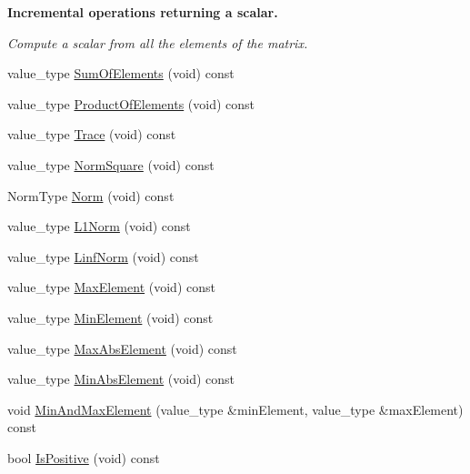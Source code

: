 \begin{Indent}{\bf Incremental operations returning a scalar.}\par
{\em Compute a scalar from all the elements of the matrix. }\begin{DoxyCompactItemize}
\item 
value\+\_\+type \hyperlink{classvct_dynamic_const_matrix_base_a134c1b6991bafceabe7bb6baa08e05b9}{Sum\+Of\+Elements} (void) const 
\item 
value\+\_\+type \hyperlink{classvct_dynamic_const_matrix_base_ae2401f9df53f4d7b880c271c4117d542}{Product\+Of\+Elements} (void) const 
\item 
value\+\_\+type \hyperlink{classvct_dynamic_const_matrix_base_a69cd40632166abe056fc04afebd3922f}{Trace} (void) const 
\item 
value\+\_\+type \hyperlink{classvct_dynamic_const_matrix_base_a9ab094a525c18fa94af35fc9b7c8b675}{Norm\+Square} (void) const 
\item 
Norm\+Type \hyperlink{classvct_dynamic_const_matrix_base_ae921451637b0607e37648a71903209c5}{Norm} (void) const 
\item 
value\+\_\+type \hyperlink{classvct_dynamic_const_matrix_base_af283598f2cd1fe140c29c7c797bbacae}{L1\+Norm} (void) const 
\item 
value\+\_\+type \hyperlink{classvct_dynamic_const_matrix_base_aa5e4b0efae23402d75dce86bb4b0357b}{Linf\+Norm} (void) const 
\item 
value\+\_\+type \hyperlink{classvct_dynamic_const_matrix_base_a0b851bf9b21d090b357fd0382d9149f6}{Max\+Element} (void) const 
\item 
value\+\_\+type \hyperlink{classvct_dynamic_const_matrix_base_a7c06585d5f8b84c9b7254aa4d5bf87d5}{Min\+Element} (void) const 
\item 
value\+\_\+type \hyperlink{classvct_dynamic_const_matrix_base_aa51ebe99fc5bd04094b69b55f36efe3c}{Max\+Abs\+Element} (void) const 
\item 
value\+\_\+type \hyperlink{classvct_dynamic_const_matrix_base_a9364e35da48457ef1e9644297cf8b5b9}{Min\+Abs\+Element} (void) const 
\item 
void \hyperlink{classvct_dynamic_const_matrix_base_ac39de02aa220ba1f5d6808b98f96997c}{Min\+And\+Max\+Element} (value\+\_\+type \&min\+Element, value\+\_\+type \&max\+Element) const 
\item 
bool \hyperlink{classvct_dynamic_const_matrix_base_a6131a3d91b7c0558f1e16a0035b8ef29}{Is\+Positive} (void) const 
\item 

\end{DoxyCompactItemize}
\end{Indent}
